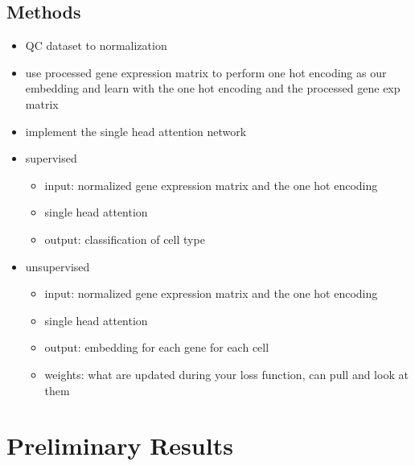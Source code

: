 \documentclass{article}
\begin{document}
\subsection{Methods}
\begin{itemize}

\item QC dataset to normalization
\item use processed gene expression matrix to perform one hot encoding as our embedding and learn with the one hot encoding and the processed gene exp matrix

\item implement the single head attention network

\item supervised

  \begin{itemize}
    \item input: normalized gene expression matrix and the one hot encoding
    \item single head attention
    \item output: classification of cell type
  \end{itemize}
  
  \item unsupervised
    \begin{itemize}
      \item input: normalized gene expression matrix and the one hot encoding
      \item single head attention
      \item output: embedding for each gene for each cell
      \item weights: what are updated during your loss function, can pull and look at them
    \end{itemize}

\end{itemize}

\section{Preliminary Results}
\end{document}
